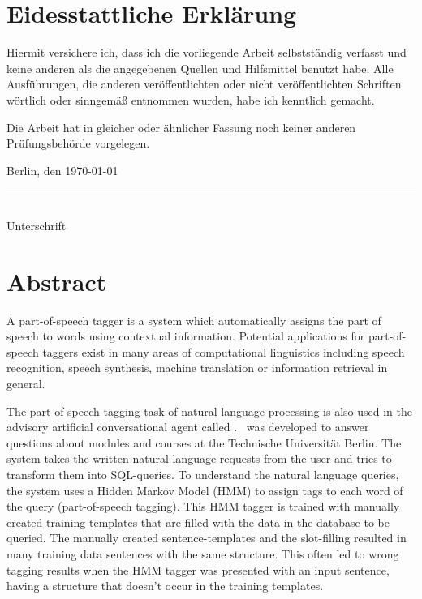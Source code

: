 \BlankPage

\chapter*{Eidesstattliche Erklärung}
Hiermit versichere ich, dass ich die vorliegende Arbeit selbstständig verfasst und keine anderen als die angegebenen Quellen und Hilfsmittel benutzt habe. Alle Ausführungen, die anderen veröffentlichten oder nicht veröffentlichten Schriften wörtlich oder sinngemäß entnommen wurden, habe ich kenntlich gemacht.

Die Arbeit hat in gleicher oder ähnlicher Fassung noch keiner anderen Prüfungsbehörde vorgelegen.
\vspace{10mm}

Berlin, den \today\\

\vspace{1cm}
\rule{.5\textwidth}{.5pt}\\
Unterschrift

\BlankPage

\chapter*{Abstract}
A part-of-speech tagger is a system which automatically assigns the part of speech to words using contextual information. Potential applications for part-of-speech taggers exist in many areas of computational linguistics including speech recognition, speech synthesis, machine translation or information retrieval in general.

The part-of-speech tagging task of natural language processing is also used in the advisory artificial conversational agent called \Alex. \Alex\ was developed to answer questions about modules and courses at the Technische Universität Berlin. The system takes the written natural language requests from the user and tries to transform them into SQL-queries. To understand the natural language queries, the system uses a Hidden Markov Model (HMM) to assign tags to each word of the query (part-of-speech tagging). This HMM tagger is trained with manually created training templates that are filled with the data in the database to be queried. The manually created sentence-templates and the slot-filling resulted in many training data sentences with the same structure. This often led to wrong tagging results when the HMM tagger was presented with an input sentence, having a structure that doesn't occur in the training templates.

